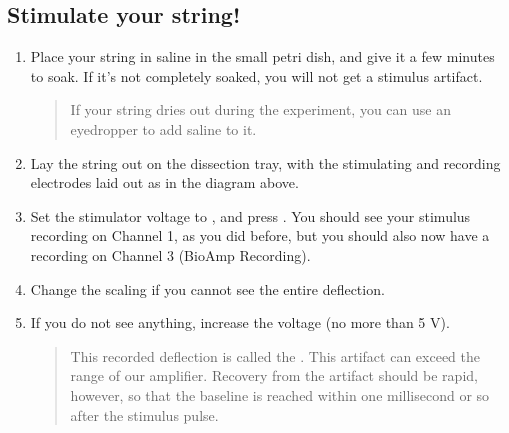 \documentclass[letterpaper,10pt,english]{jupyterBook}
\let\sphinxpxdimen\pdfpxdimen\else\newdimen\sphinxpxdimen
\begin{document}
\subsection{Stimulate your string!}
\label{\detokenize{StringNervousSystems:stimulate-your-string}}
\noindent{\hspace*{\fill}\sphinxincludegraphics[width=150\sphinxpxdimen]{{string_electrodes}.png}\hspace*{\fill}}
\begin{enumerate}
%
\item {} 
\sphinxAtStartPar
Place your string in saline in the small petri dish, and give it a few minutes to soak. If it’s not completely soaked, you will not get a stimulus artifact.
\begin{quote}

\sphinxAtStartPar
{} If your string dries out during the experiment, you can use an eyedropper to add saline to it.
\end{quote}

\item {} 
\sphinxAtStartPar
Lay the string out on the dissection tray, with the stimulating and recording electrodes laid out as in the diagram above.

\item {} 
\sphinxAtStartPar
Set the stimulator voltage to , and press . You should see your stimulus recording on Channel 1, as you did before, but you should also now have a recording on Channel 3 (BioAmp Recording).

\item {} 
\sphinxAtStartPar
Change the scaling if you cannot see the entire deflection.

\item {} 
\sphinxAtStartPar
If you do not see anything, increase the voltage (no more than 5 V).
\begin{quote}

\sphinxAtStartPar
{} This recorded deflection is called the . This artifact can exceed the range of our amplifier. Recovery from the artifact should be rapid, however, so that the baseline is reached within one millisecond or so after the stimulus pulse.
\end{quote}

\end{enumerate}
\end{document}
